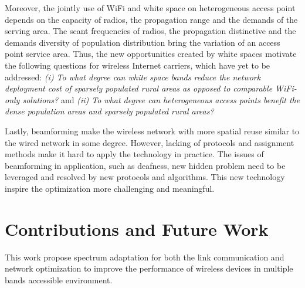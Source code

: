 Moreover, the jointly use of WiFi and white space on heterogeneous 
access point depends on the capacity of radios, the propagation range 
and the demands of the serving area. The scant frequencies of radios, 
the propagation distinctive and the demands diversity of population 
distribution bring the variation of an access point service area. 
Thus, the new opportunities created by white spaces motivate the following 
questions for wireless Internet carriers, which have yet to be addressed: 
{\it (i) To what degree can white space bands reduce the network deployment 
cost of sparsely populated rural areas as opposed to comparable WiFi-only 
solutions?} and {\it (ii) To what degree can heterogeneous access points 
benefit the dense population areas and sparsely populated rural areas?}

Lastly, beamforming make the wireless network with more spatial reuse 
similar to the wired network in some degree. However, lacking of protocols 
and assignment methods make it hard to apply the technology in practice. 
The issues of beamforming in application, such as deafness, new hidden 
problem need to be leveraged and resolved by new protocols and algorithms. 
This new technology inspire the optimization more challenging and meaningful.

\section{Contributions and Future Work}

This work propose spectrum adaptation for both the link communication and 
network optimization to improve the performance of wireless devices in 
multiple bands accessible environment.

